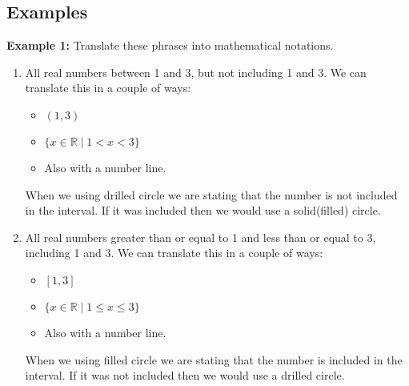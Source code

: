\subsection{Examples}
\textbf{Example 1:} Translate these phrases into mathematical notations.
\begin{enumerate}
    \item All real numbers between 1 and 3, but not including 1 and 3.
          We can translate this in a couple of ways:
          \begin{itemize}
              \item $(1, 3)$
              \item $\{x \in \mathbb{R} \mid 1 < x < 3\}$
              \item Also with a number line. \\
          \end{itemize}
          When we using drilled circle we are stating that the number is not included in the interval. If it was included then we would use a solid(filled) circle.

    \item All real numbers greater than or equal to 1 and less than or equal to 3, including 1 and 3.
          We can translate this in a couple of ways:
          \begin{itemize}
              \item $[1, 3]$
              \item $\{x \in \mathbb{R} \mid 1 \leq x \leq 3\}$
              \item Also with a number line. \\
          \end{itemize}
          When we using filled circle we are stating that the number is included in the interval. If it was not included then we would use a drilled circle.
\end{enumerate}
